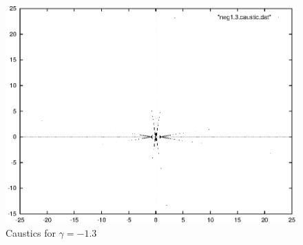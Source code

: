 \documentclass[a4paper]{IEEEtran}
\begin{document}
    \begin{figure}
        \caption{Caustics for $\gamma = -1.3$} 
        \label{fig:caustics-gamma-1-3}
        \begin{center}
            \includegraphics[width=\columnwidth]{images/neg1-3-caustic.eps} 
        \end{center}
    \end{figure}
\end{document}
